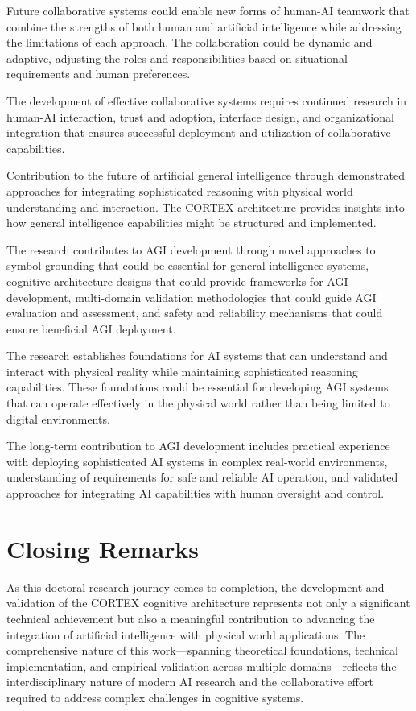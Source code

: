 Future collaborative systems could enable new forms of human-AI teamwork that combine the strengths of both human and artificial intelligence while addressing the limitations of each approach. The collaboration could be dynamic and adaptive, adjusting the roles and responsibilities based on situational requirements and human preferences.

The development of effective collaborative systems requires continued research in human-AI interaction, trust and adoption, interface design, and organizational integration that ensures successful deployment and utilization of collaborative capabilities.

Contribution to the future of artificial general intelligence through demonstrated approaches for integrating sophisticated reasoning with physical world understanding and interaction. The CORTEX architecture provides insights into how general intelligence capabilities might be structured and implemented.

The research contributes to AGI development through novel approaches to symbol grounding that could be essential for general intelligence systems, cognitive architecture designs that could provide frameworks for AGI development, multi-domain validation methodologies that could guide AGI evaluation and assessment, and safety and reliability mechanisms that could ensure beneficial AGI deployment.

The research establishes foundations for AI systems that can understand and interact with physical reality while maintaining sophisticated reasoning capabilities. These foundations could be essential for developing AGI systems that can operate effectively in the physical world rather than being limited to digital environments.

The long-term contribution to AGI development includes practical experience with deploying sophisticated AI systems in complex real-world environments, understanding of requirements for safe and reliable AI operation, and validated approaches for integrating AI capabilities with human oversight and control.

\section{Closing Remarks}

As this doctoral research journey comes to completion, the development and validation of the CORTEX cognitive architecture represents not only a significant technical achievement but also a meaningful contribution to advancing the integration of artificial intelligence with physical world applications. The comprehensive nature of this work—spanning theoretical foundations, technical implementation, and empirical validation across multiple domains—reflects the interdisciplinary nature of modern AI research and the collaborative effort required to address complex challenges in cognitive systems.

